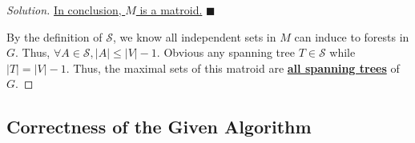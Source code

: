 \documentclass{article}
\renewcommand{\qedsymbol}{\hfill $\blacksquare$\par}
\newenvironment{solution}{\begin{proof}[\noindent\it Solution]}{\end{proof}}
\begin{document}
\begin{solution}
    \vspace{2em} \hspace{2.6em}
    \underline{In conclusion, $M$ is a matroid.} \qedsymbol
    
    \vspace{2em} \hspace{2.6em}
    By the definition of $\mathcal{S}$, we know all independent sets in $M$ can induce to forests in $G$. Thus, $\forall A\in\mathcal{S}, |A|\le |V|-1.$ Obvious any spanning tree $T\in\mathcal{S}$ while $|T|=|V|-1$. Thus, the maximal sets of this matroid are \underline{\textbf{all spanning trees}} of $G$.
\end{solution}

\vspace{3em}
\subsection{Correctness of the Given Algorithm}
\vspace{1em}
\end{document}
